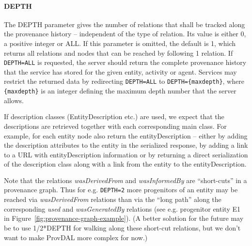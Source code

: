 \paragraph{{DEPTH}}
The DEPTH parameter gives the number of relations that shall be tracked along
the provenance history -- independent of the type of relation. Its value is
either 0, a positive integer or ALL. If this parameter is omitted,
the default is 1, which returns all relations and nodes that can be reached
by following 1 relation. If \texttt{DEPTH=ALL} is requested, the server should
return the complete provenance history that the service has stored for the
given entity, activity or agent.
Services may restrict the returned data by
redirecting \texttt{DEPTH=ALL} to \texttt{DEPTH=\{maxdepth\}}, where
\texttt{\{maxdepth\}} is an integer defining the maximum depth number that
the server allows.

If description classes (EntityDescription etc.) are used, we expect that the descriptions are retrieved together with each corresponding main class. For example, for each entity node also return the entityDescription -- either by adding the description attributes to the entity in the serialized response, by adding a link to a URL with entityDescription information or by returning a
direct serialization of the description class along with a link from the entity to the entityDescription.


Note that the relations \emph{wasDerivedFrom} and \emph{wasInformedBy} are ``short-cuts''
in a provenance graph. Thus for e.g. \texttt{DEPTH=2} more progenitors of an entity may
be reached via \emph{wasDerivedFrom} relations than via the ``long path'' along the
corresponding \emph{used} and \emph{wasGeneratedBy} relations (see e.g. progenitor entity E1 in
Figure~\ref{fig:provenance-graph-example}).
(A better solution for the future may be to use 1/2*DEPTH for walking along these short-cut relations, but we don't want to make ProvDAL more complex for now.)


